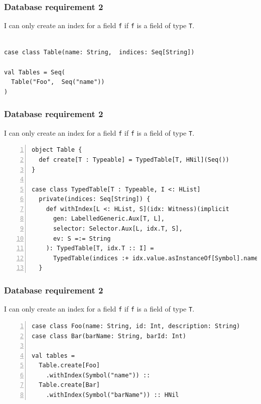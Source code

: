 \documentclass[aspectratio=169]{beamer}
\begin{document}
\begin{frame}[fragile]
\frametitle{Database requirement 2}
I can only create an index for a field \texttt{f} if \texttt{f} is a field of type \texttt{T}.
\hfill \break
\begin{lstlisting}[style=myScalaStyle,frame=none,escapeinside=||]

case class Table(name: String,  indices: Seq[String])

val Tables = Seq(
  Table("Foo",  Seq("name"))
)

\end{lstlisting}

\end{frame}

\begin{frame}[fragile]
\frametitle{Database requirement 2}
I can only create an index for a field \texttt{f} if \texttt{f} is a field of type \texttt{T}.
\hfill \break
\begin{lstlisting}[style=myScalaStyle,frame=none,escapeinside=||,numbers=left]
object Table {
  def create[T : Typeable] = TypedTable[T, HNil](Seq())
}

case class TypedTable[T : Typeable, I <: HList] 
  private(indices: Seq[String]) {
    def withIndex[L <: HList, S](idx: Witness)(implicit 
      gen: LabelledGeneric.Aux[T, L], 
      selector: Selector.Aux[L, idx.T, S], 
      ev: S =:= String
    ): TypedTable[T, idx.T :: I] =
      TypedTable(indices :+ idx.value.asInstanceOf[Symbol].name)
  }

\end{lstlisting}

\end{frame}

\begin{frame}[fragile]
\frametitle{Database requirement 2}
I can only create an index for a field \texttt{f} if \texttt{f} is a field of type \texttt{T}.
\hfill \break
\begin{lstlisting}[style=myScalaStyle,frame=none,escapeinside=||,numbers=left]
case class Foo(name: String, id: Int, description: String)
case class Bar(barName: String, barId: Int)

val tables =
  Table.create[Foo]
    .withIndex(Symbol("name")) ::
  Table.create[Bar]
    .withIndex(Symbol("barName")) :: HNil

\end{lstlisting}

\end{frame}
\end{document}
